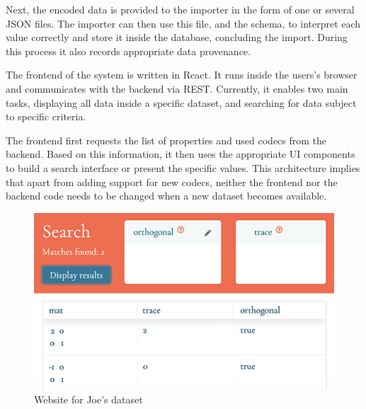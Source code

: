 Next, the encoded data is provided to the importer in the form of one or several JSON files. 
The importer can then use this file, and the schema, to interpret each value correctly and store it inside the database, concluding the import. 
During this process it also records appropriate data provenance. 

The frontend of the system is written in React. 
It runs inside the users's browser and communicates with the backend via REST. 
Currently, it enables two main tasks, displaying all data inside a specific dataset, and searching for data subject to specific criteria. 

The frontend first requests the list of properties and used codecs from the backend. 
Based on this information, it then uses the appropriate UI components to build a search interface or present the specific values. 
This architecture implies that apart from adding support for new codecs, neither the frontend nor the backend code needs to be changed when a new dataset becomes available. 

\begin{figure}[ht]
  \includegraphics{data_joe.png}
  \caption{Website for Joe's dataset}\label{fig:joe}
\end{figure}

\medskip

